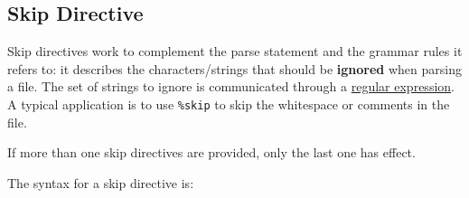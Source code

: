 
\subsection{Skip Directive}
{
	Skip directives work to complement the parse statement and the
	grammar rules it refers to: it describes the characters/strings that
	should be \textbf{ignored} when parsing a file. The set of strings to
	ignore is communicated through a \hyperref[sec:regex]{regular expression}.
	A typical application is to use \texttt{\%skip} to skip the whitespace
	or comments in the file.
	
	If more than one skip directives are provided, only
	the last one has effect.
	
	The syntax for a skip directive is:
	\begin{lstlisting}[numbers = none, texcl = true, language = MAIA]
%skip: <regular-expression>;
	\end{lstlisting}
}
